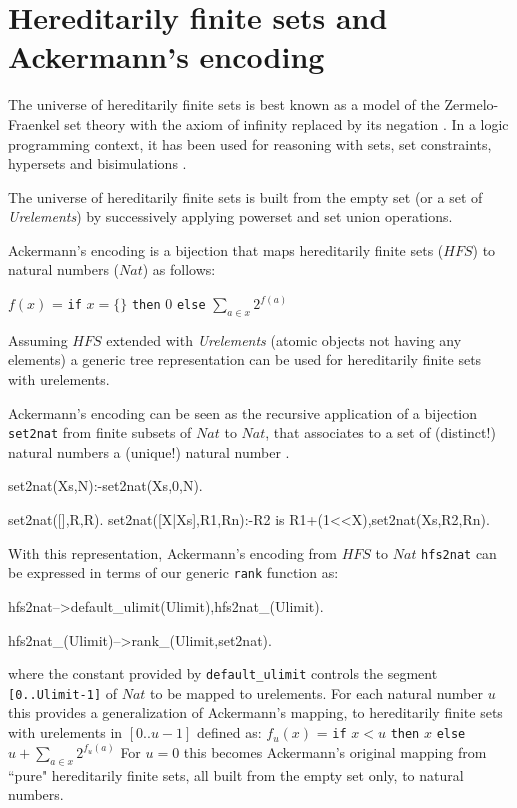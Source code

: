 \documentclass[]{INCLUDES/llncs}
\begin{document}
\section{Hereditarily finite sets and Ackermann's encoding} \label{ack}

The universe of hereditarily finite sets is best known as a model of the 
Zermelo-Fraenkel set theory with the axiom of infinity  replaced by its 
negation \cite{finitemath,DBLP:journals/jct/MeirMM83}. In a logic programming
context, it has been used for reasoning with sets, set constraints,
hypersets and bisimulations \cite{dovier00comparing,DBLP:journals/tplp/PiazzaP04}.

The universe of hereditarily finite sets is built from the empty set 
(or a set of {\em Urelements}) 
by successively applying powerset and set union operations.

Ackermann's encoding \cite{ackencoding,abian78,kaye07,arxiv:fISO} is a bijection
that maps hereditarily finite sets ($HFS$) to natural numbers ($Nat$) as follows:

\vskip 0.5cm
$f(x)$ = {\tt if} $x=\{\}$ {\tt then} $0$ {\tt else} $\sum_{a \in x}2^{f(a)}$
\vskip 0.5cm

Assuming $HFS$ extended with {\em Urelements} (atomic objects not having any
elements) a generic tree representation can be used for hereditarily finite
sets with urelements.

Ackermann's encoding can be seen as the recursive application of 
a bijection {\tt set2nat} from finite subsets of $Nat$ to $Nat$, that associates to 
a set of (distinct!) natural numbers a (unique!) natural number
\cite{arxiv:fISO}.
\begin{code} 
set2nat(Xs,N):-set2nat(Xs,0,N).

set2nat([],R,R).
set2nat([X|Xs],R1,Rn):-R2 is R1+(1<<X),set2nat(Xs,R2,Rn).
\end{code}
With this representation, Ackermann's encoding from $HFS$ to $Nat$ {\tt hfs2nat} 
can be expressed in terms of our generic {\tt rank} function as:
\begin{code}
hfs2nat-->default_ulimit(Ulimit),hfs2nat_(Ulimit).

hfs2nat_(Ulimit)-->rank_(Ulimit,set2nat).
\end{code}
where the constant provided by {\tt default\_ulimit} controls the
segment {\tt [0..Ulimit-1]} of $Nat$ to be mapped to urelements. 
For each natural number $u$ this provides a generalization of Ackermann's
mapping, to hereditarily finite sets with urelements in $[0..u-1]$ defined as:
\vskip 0.30cm
$f_{u}(x)$ = 
{\tt if} $x<u$ 
{\tt then} $x$
{\tt else} $u+\sum_{a\in x}2^{f_{u}(a)}$ 
\vskip 0.30cm
For $u=0$ this becomes Ackermann's original mapping from ``pure" hereditarily
finite sets, all built from the empty set only, to natural numbers.
\end{document}
